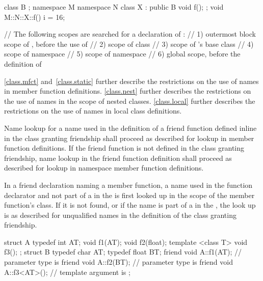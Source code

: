 \begin{example}
\begin{codeblock}
class B { };
namespace M {
  namespace N {
    class X : public B {
      void f();
    };
  }
}
void M::N::X::f() {
  i = 16;
}

// The following scopes are searched for a declaration of :
// 1) outermost block scope of , before the use of 
// 2) scope of class 
// 3) scope of 's base class 
// 4) scope of namespace 
// 5) scope of namespace 
// 6) global scope, before the definition of 
\end{codeblock}
\end{example}
\begin{note}
\ref{class.mfct} and~\ref{class.static} further
describe the restrictions on the use of names in member function
definitions. \ref{class.nest} further describes the restrictions on the
use of names in the scope of nested classes. \ref{class.local} further
describes the restrictions on the use of names in local class
definitions.
\end{note}

\pnum
Name lookup for a name used in the definition of a friend
function defined inline in the class granting
friendship shall proceed as described for lookup in member function
definitions. If the friend function is not defined in the class
granting friendship, name lookup in the friend function
definition shall proceed as described for lookup in namespace member
function definitions.

\pnum
In a friend declaration naming a member function, a name used in
the function declarator and not part of a 
in the  is first looked up in the scope of the
member function's class. If it is not found,
or if the name is part of a
 in
the , the look up is
as described for unqualified names in the definition of the class
granting friendship.
\begin{example}
\begin{codeblock}
struct A {
  typedef int AT;
  void f1(AT);
  void f2(float);
  template <class T> void f3();
};
struct B {
  typedef char AT;
  typedef float BT;
  friend void A::f1(AT);        // parameter type is 
  friend void A::f2(BT);        // parameter type is 
  friend void A::f3<AT>();      // template argument is 
};
\end{codeblock}
\end{example}


